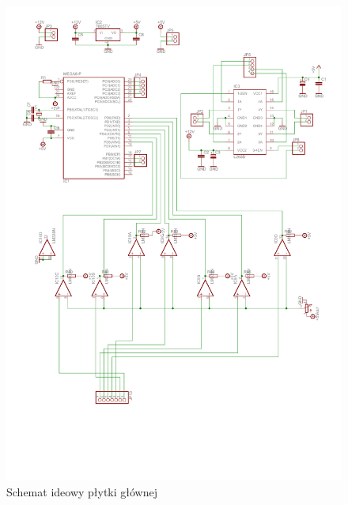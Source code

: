 \documentclass[11pt,a4paper]{article}
\begin{document}
  \begin{center}
    \begin{figure}[H]
    \includegraphics[scale=0.8]{schemat_glowna}
    \caption{Schemat ideowy płytki głównej}
    \end{figure}
    

\end{center}
\end{document}
